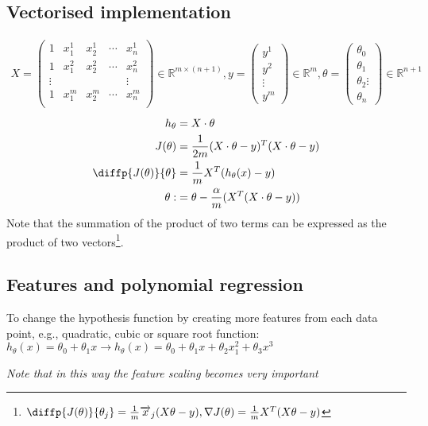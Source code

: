 \subsection{Vectorised implementation}
\begin{align*}
X = \begin{pmatrix} 
    1 & x_1^1 & x_2^1 & \cdots & x_n^1 \\
    1 & x_1^2 & x_2^2 & \cdots & x_n^2 \\
    \vdots &&&& \vdots \\
    1 & x_1^m & x_2^m & \cdots & x_n^m \\
     \end{pmatrix} 
\in \mathbb{R}^{m \times (n+1)},
y=\begin{pmatrix} y^1 \\ y^2 \\ \vdots \\ y^m \end{pmatrix} \in \mathbb{R}^{m},
\theta = \begin{pmatrix} \theta_0 \\ \theta_1 \\ \theta_2 \vdots \\ \theta_n \end{pmatrix} \in \mathbb{R}^{n+1}
\end{align*}
\begin{align}
h_\theta &= X \cdot \theta\\
J(\theta) &= \frac{1}{2m} (X \cdot \theta -y)^T (X \cdot \theta - y)\\
\diffp{J(\theta)}{\theta} &= \frac{1}{m}X^T(h_\theta(x)-y)\\
\theta : &= \theta - \frac{\alpha}{m}(X^T(X \cdot \theta -y))
\end{align}
Note that the summation of the product of two terms can be expressed as the product of two vectors\footnote{$
\diffp{J(\theta)}{{\theta_j}} = \frac{1}{m} \overrightarrow{x}_j (X\theta - y),
\nabla{J(\theta)} = \frac{1}{m}X^T(X\theta - y)
$}.
%
\subsection{Features and polynomial regression}
To change the hypothesis function by creating more features from each data point, e.g., quadratic, cubic or square root function:\\
$h_\theta(x) = \theta_0 + \theta_1x \rightarrow h_\theta(x) = \theta_0 + \theta_1x + \theta_2x_1^2 + \theta_3x^3$

\emph{\textcolor{Bittersweet}{Note that in this way the feature scaling becomes very important}}

